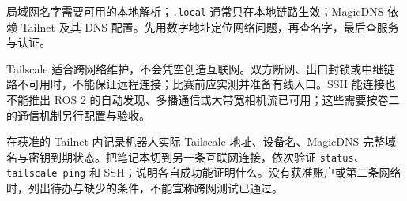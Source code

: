 \begin{conclusion}
局域网名字需要可用的本地解析；\texttt{.local} 通常只在本地链路生效；MagicDNS 依赖 Tailnet 及其 DNS 配置。先用数字地址定位网络问题，再查名字，最后查服务与认证。

Tailscale 适合跨网络维护，不会凭空创造互联网。双方断网、出口封锁或中继链路不可用时，不能保证远程连接；比赛前应实测并准备有线入口。SSH 能连接也不能推出 ROS 2 的自动发现、多播通信或大带宽相机流已可用；这些需要按卷二的通信机制另行配置与验收。
\end{conclusion}

\begin{exercise}\label{ex:deploy-tailscale}
在获准的 Tailnet 内记录机器人实际 Tailscale 地址、设备名、MagicDNS 完整域名与密钥到期状态。把笔记本切到另一条互联网连接，依次验证 \texttt{status}、\texttt{tailscale ping} 和 SSH；说明各自成功能证明什么。没有获准账户或第二条网络时，列出待办与缺少的条件，不能宣称跨网测试已通过。
\end{exercise}
